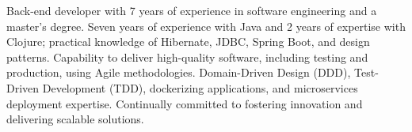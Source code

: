 \vspace*{-10pt}
\begin{referees}
\par{
    Back-end developer with 7 years of experience in software engineering and a master's degree. Seven years of experience with Java and 2 years of expertise with Clojure; practical knowledge of Hibernate, JDBC, Spring Boot, and design patterns. Capability to deliver high-quality software, including testing and production, using Agile methodologies. Domain-Driven Design (DDD), Test-Driven Development (TDD), dockerizing applications, and microservices deployment expertise. Continually committed to fostering innovation and delivering scalable solutions.}
\end{referees}	